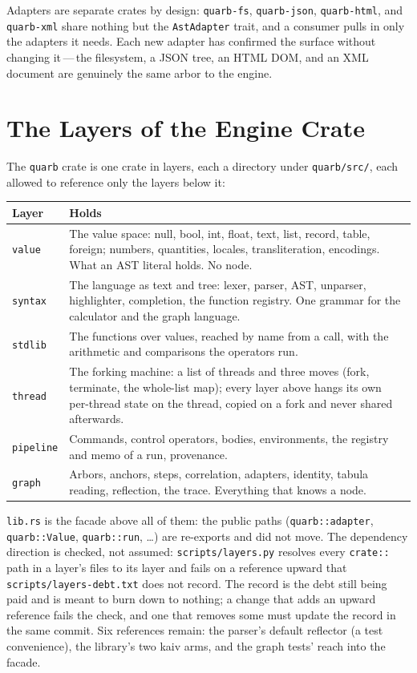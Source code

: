 \documentclass{report}
\begin{document}
\medskip

Adapters are separate crates by design: \texttt{quarb-fs},
\texttt{quarb-json}, \texttt{quarb-html}, and \texttt{quarb-xml}
share nothing but the \texttt{AstAdapter} trait, and a consumer
pulls in only the adapters it needs. Each new adapter has confirmed
the surface without changing it\,---\,the filesystem, a JSON tree,
an HTML DOM, and an XML document are genuinely the same arbor to
the engine.

\section{The Layers of the Engine Crate}\label{sec:layers}

The \texttt{quarb} crate is one crate in layers, each a directory
under \texttt{quarb/src/}, each allowed to reference only the layers
below it:

\begin{xltabular}{\textwidth}{l X}
\toprule
\textbf{Layer} & \textbf{Holds} \\
\midrule
\texttt{value} & The value space: null, bool, int, float, text,
  list, record, table, foreign; numbers, quantities, locales,
  transliteration, encodings. What an AST literal holds. No node. \\
\texttt{syntax} & The language as text and tree: lexer, parser,
  AST, unparser, highlighter, completion, the function registry.
  One grammar for the calculator and the graph language. \\
\texttt{stdlib} & The functions over values, reached by name from
  a call, with the arithmetic and comparisons the operators run. \\
\texttt{thread} & The forking machine: a list of threads and three
  moves (fork, terminate, the whole-list map); every layer above
  hangs its own per-thread state on the thread, copied on a fork
  and never shared afterwards. \\
\texttt{pipeline} & Commands, control operators, bodies,
  environments, the registry and memo of a run, provenance. \\
\texttt{graph} & Arbors, anchors, steps, correlation, adapters,
  identity, tabula reading, reflection, the trace. Everything
  that knows a node. \\
\bottomrule
\end{xltabular}

\texttt{lib.rs} is the facade above all of them: the public paths
(\texttt{quarb::adapter}, \texttt{quarb::Value}, \texttt{quarb::run},
\ldots) are re-exports and did not move. The dependency direction is
checked, not assumed: \texttt{scripts/layers.py} resolves every
\texttt{crate::} path in a layer's files to its layer and fails on a
reference upward that \texttt{scripts/layers-debt.txt} does not
record. The record is the debt still being paid and is meant to
burn down to nothing; a change that adds an upward reference fails
the check, and one that removes some must update the record in the
same commit. Six references remain: the parser's default reflector
(a test convenience), the library's two kaiv arms, and the graph
tests' reach into the facade.
\end{document}
